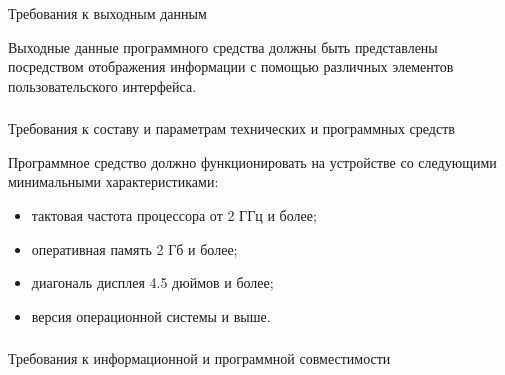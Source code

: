 \subsubsection{} Требования к выходным данным
\label{sec:analysis:specification:outputs}

Выходные данные программного средства должны быть представлены посредством отображения информации с помощью различных элементов пользовательского интерфейса.

\subsubsection{} Требования к составу и параметрам технических и программных средств
\label{sec:analysis:specification:minimal_requirements}

Программное средство должно функционировать на устройстве со следующими минимальными характеристиками:

\begin{itemize}
    \item тактовая частота процессора от 2 ГГц и более;
    \item оперативная память 2 Гб и более;
    \item диагональ дисплея 4.5 дюймов и более;
    \item версия операционной системы  и выше.
\end{itemize}


\subsubsection{} Требования к информационной и программной совместимости
\label{sec:analysis:specification:compatibility}

